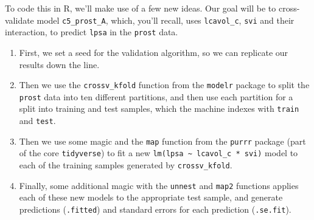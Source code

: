 \documentclass[]{book}
\newenvironment{Shaded}{\begin{snugshade}}{\end{snugshade}}
\newcommand{\KeywordTok}[1]{\textcolor[rgb]{0.13,0.29,0.53}{\textbf{#1}}}
\newcommand{\DataTypeTok}[1]{\textcolor[rgb]{0.13,0.29,0.53}{#1}}
\newcommand{\DecValTok}[1]{\textcolor[rgb]{0.00,0.00,0.81}{#1}}
\newcommand{\StringTok}[1]{\textcolor[rgb]{0.31,0.60,0.02}{#1}}
\newcommand{\OperatorTok}[1]{\textcolor[rgb]{0.81,0.36,0.00}{\textbf{#1}}}
\newcommand{\NormalTok}[1]{#1}
\providecommand{\tightlist}{%
  \setlength{\itemsep}{0pt}\setlength{\parskip}{0pt}}
\theoremstyle{definition}
\theoremstyle{definition}
\theoremstyle{definition}
\theoremstyle{remark}
\begin{document}
To code this in R, we'll make use of a few new ideas. Our goal will be
to cross-validate model \texttt{c5\_prost\_A}, which, you'll recall,
uses \texttt{lcavol\_c}, \texttt{svi} and their interaction, to predict
\texttt{lpsa} in the \texttt{prost} data.

\begin{enumerate}
\def\labelenumi{\arabic{enumi}.}
\tightlist
\item
  First, we set a seed for the validation algorithm, so we can replicate
  our results down the line.
\item
  Then we use the \texttt{crossv\_kfold} function from the
  \texttt{modelr} package to split the \texttt{prost} data into ten
  different partitions, and then use each partition for a split into
  training and test samples, which the machine indexes with
  \texttt{train} and \texttt{test}.
\item
  Then we use some magic and the \texttt{map} function from the
  \texttt{purrr} package (part of the core \texttt{tidyverse}) to fit a
  new \texttt{lm(lpsa\ \textasciitilde{}\ lcavol\_c\ *\ svi)} model to
  each of the training samples generated by \texttt{crossv\_kfold}.
\item
  Finally, some additional magic with the \texttt{unnest} and
  \texttt{map2} functions applies each of these new models to the
  appropriate test sample, and generate predictions (\texttt{.fitted})
  and standard errors for each prediction (\texttt{.se.fit}).
\end{enumerate}

\begin{Shaded}
\end{Shaded}
\end{document}
